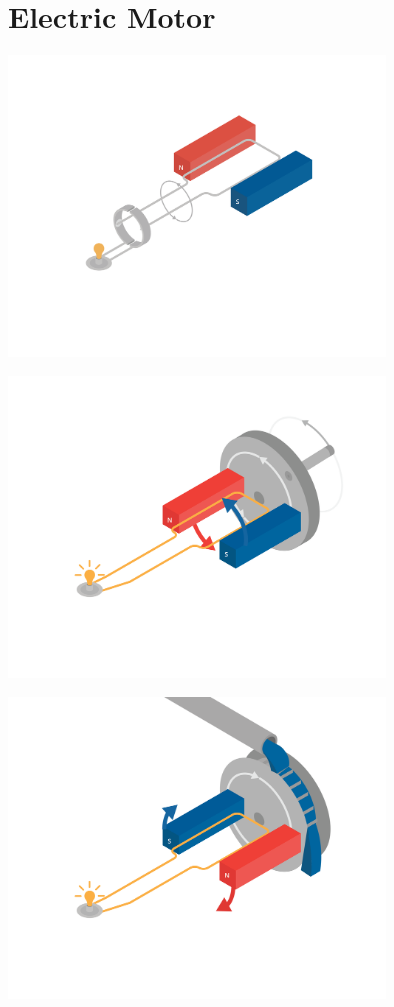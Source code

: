 \chapter{Electric Motor}


\includegraphics[width=0.75\textwidth]{basicGenerator.png}

\includegraphics[width=0.75\textwidth]{basicGeneratorCrank.png}

\includegraphics[width=0.75\textwidth]{basicGeneratorWheel.png}

